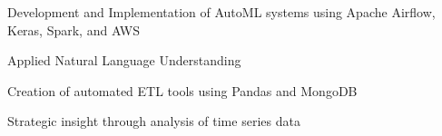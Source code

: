 \documentclass[letterpaper]{deedy-resume} %
\begin{document}
\begin{minipage}[t]{0.66\textwidth}
\begin{tightitemize}
\item Development and Implementation of AutoML systems using Apache Airflow, Keras, Spark, and AWS
\item Applied Natural Language Understanding
\end{tightitemize}

\begin{tightitemize}
\item Creation of automated ETL tools using Pandas and MongoDB
\item Strategic insight through analysis of time series data
\end{tightitemize}


%
%
%
%
%








\end{minipage}
\end{document}
